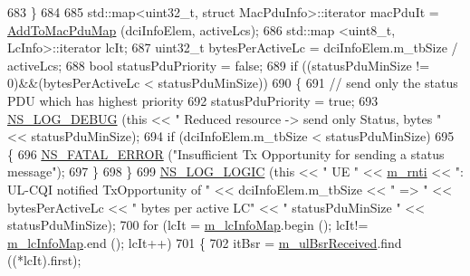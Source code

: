 \begin{DoxyCode}
683                                 \}
684 
685                                 std::map<uint32\_t, struct MacPduInfo>::iterator macPduIt = 
      \hyperlink{classns3_1_1MmWaveUeMac_aa1511195bae11decbb06c163fe65891b}{AddToMacPduMap} (dciInfoElem, activeLcs);
686                                 std::map <uint8\_t, LcInfo>::iterator lcIt;
687                                 uint32\_t bytesPerActiveLc = dciInfoElem.m\_tbSize / activeLcs;
688                                 \textcolor{keywordtype}{bool} statusPduPriority = \textcolor{keyword}{false};
689                                 \textcolor{keywordflow}{if} ((statusPduMinSize != 0)&&(bytesPerActiveLc < statusPduMinSize))
690                                 \{
691                                         \textcolor{comment}{// send only the status PDU which has highest priority}
692                                         statusPduPriority = \textcolor{keyword}{true};
693                                         \hyperlink{group__logging_ga413f1886406d49f59a6a0a89b77b4d0a}{NS\_LOG\_DEBUG} (\textcolor{keyword}{this} << \textcolor{stringliteral}{" Reduced resource -> send only
       Status, bytes "} << statusPduMinSize);
694                                         \textcolor{keywordflow}{if} (dciInfoElem.m\_tbSize < statusPduMinSize)
695                                         \{
696                                                 \hyperlink{group__fatal_ga5131d5e3f75d7d4cbfd706ac456fdc85}{NS\_FATAL\_ERROR} (\textcolor{stringliteral}{"Insufficient Tx Opportunity
       for sending a status message"});
697                                         \}
698                                 \}
699                                 \hyperlink{group__logging_ga88acd260151caf2db9c0fc84997f45ce}{NS\_LOG\_LOGIC} (\textcolor{keyword}{this} << \textcolor{stringliteral}{" UE "} << 
      \hyperlink{classns3_1_1MmWaveUeMac_a73d6bc08e75e3a20c5fbaf3113cf40f5}{m\_rnti} << \textcolor{stringliteral}{": UL-CQI notified TxOpportunity of "} << dciInfoElem.m\_tbSize << \textcolor{stringliteral}{" => "} << bytesPerActiveLc
       << \textcolor{stringliteral}{" bytes per active LC"} << \textcolor{stringliteral}{" statusPduMinSize "} << statusPduMinSize);
700                                 \textcolor{keywordflow}{for} (lcIt = \hyperlink{classns3_1_1MmWaveUeMac_a0797806054f43d23d0635440bcef7350}{m\_lcInfoMap}.begin (); lcIt!=
      \hyperlink{classns3_1_1MmWaveUeMac_a0797806054f43d23d0635440bcef7350}{m\_lcInfoMap}.end (); lcIt++)
701                                 \{
702                                         itBsr = \hyperlink{classns3_1_1MmWaveUeMac_a4fedb11c547b798c1546f082e147ba03}{m\_ulBsrReceived}.find ((*lcIt).first);

\end{DoxyCode}
